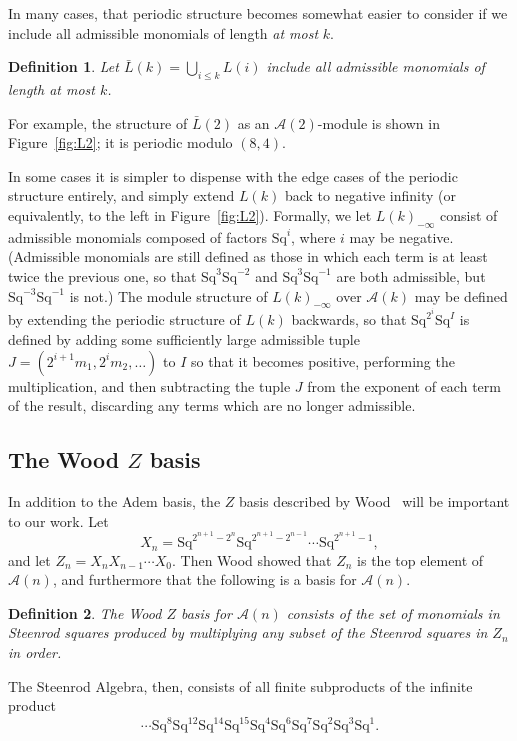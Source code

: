 \documentclass{article}
\newcommand{\A}{\mathcal{A}}
\newcommand{\Sq}{\mathrm{Sq}}
\renewcommand{\L}{\bar{L}}
\newcommand{\Lkm}[1][k]{L{(#1)}_{-\infty}}
\newtheorem{defn}{Definition}
\begin{document}
In many cases, that periodic structure becomes somewhat easier to consider if we include all admissible monomials of length \emph{at most} $k$.
\begin{defn}
  Let $\L(k)=\bigcup_{i\leq k}L(i)$ include all admissible monomials of length \emph{at most} $k$.
\end{defn}

For example, the structure of $\L(2)$ as an $\A(2)$-module is shown in Figure~\ref{fig:L2}; it is periodic modulo $(8, 4)$.

In some cases it is simpler to dispense with the edge cases of the periodic structure entirely, and simply extend $L(k)$ back to negative infinity (or equivalently, to the left in Figure~\ref{fig:L2}).  Formally, we let $\Lkm$ consist of admissible monomials composed of factors $\Sq^i$, where $i$ may be negative.  (Admissible monomials are still defined as those in which each term is at least twice the previous one, so that $\Sq^3\Sq^{-2}$ and $\Sq^3\Sq^{-1}$ are both admissible, but $\Sq^{-3}\Sq^{-1}$ is not.)  The module structure of $\Lkm$ over $\A(k)$ may be defined by extending the periodic structure of $L(k)$ backwards, so that $\Sq^{2^i}\Sq^I$ is defined by adding some sufficiently large admissible tuple $J=(2^{i+1}m_1, 2^im_2, \ldots)$ to $I$ so that it becomes positive, performing the multiplication, and then subtracting the tuple $J$ from the exponent of each term of the result, discarding any terms which are no longer admissible.


\subsection{The Wood \boldmath$Z$ basis}
In addition to the Adem basis, the $Z$ basis described by Wood~\cite{TODO} will be important to our work.  Let
\[ X_n = \Sq^{2^{n+1}-2^n}\Sq^{2^{n+1}-2^{n-1}}\cdots\Sq^{2^{n+1}-1}, \]
and let $Z_n = X_n X_{n-1}\cdots X_0$.  Then Wood showed that $Z_n$ is the top element of $\A(n)$, and furthermore that the following is a basis for $\A(n)$.
\begin{defn}
  The Wood $Z$ basis for $\A(n)$ consists of the set of monomials in Steenrod squares produced by multiplying any subset of the Steenrod squares in $Z_n$ in order.
\end{defn}

The Steenrod Algebra, then, consists of all finite subproducts of the infinite product
\[ \cdots\Sq^8\Sq^{12}\Sq^{14}\Sq^{15}\Sq^4\Sq^6\Sq^7\Sq^2\Sq^3\Sq^1.\]
\end{document}
